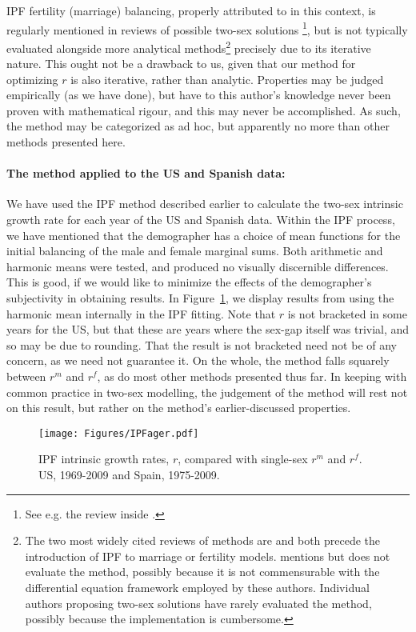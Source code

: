 IPF fertility (marriage) balancing, properly attributed to \citet{mc1975models}
in this context, is regularly mentioned in reviews of possible two-sex solutions \footnote{See e.g.
the review inside \citet{ianelli2005gender}.}, but is not typically
evaluated alongside more analytical
methods\footnote{The two most widely cited
reviews of methods are \citet{keyfitz1972mathematics} and
\citet{pollard1973mathematical} both precede the introduction of IPF to
marriage or fertility models. \citet{ianelli2005gender} mentions but does not
evaluate the method, possibly because it is not commensurable with the
differential equation framework employed by these authors. Individual authors proposing
two-sex solutions have rarely evaluated the method, possibly because the implementation
is cumbersome.} precisely due to its iterative nature. This ought not be a
drawback to us, given that our method for optimizing $r$ is also iterative,
rather than analytic. Properties may be judged empirically (as we have done),
but have to this author's knowledge never been proven with mathematical rigour,
and this may never be accomplished. As such, the method may be categorized as ad
hoc, but apparently no more than other methods presented here.

\paragraph{The method applied to the US and Spanish data:}

We have used the IPF method described earlier to calculate the two-sex intrinsic
growth rate for each year of the US and Spanish data. Within the IPF process, we
have mentioned that the demographer has a choice of mean functions for the
initial balancing of the male and female marginal sums. Both arithmetic and
harmonic means were tested, and produced no visually discernible differences.
This is good, if we would like to minimize the effects of the demographer's
subjectivity in obtaining results. In Figure~\ref{fig:IPFager}, we display
results from using the harmonic mean internally in the IPF fitting. Note that
$r$ is not bracketed in some years for the US, but that these are years where 
the sex-gap itself was trivial, and so may be due to
rounding. That the result is not bracketed need not be of any concern, as we
need not guarantee it. On the whole, the method falls squarely between $r^m$ and
$r^f$, as do most other methods presented thus far. In keeping with common
practice in two-sex modelling, the judgement of the method will rest not on this
result, but rather on the method's earlier-discussed properties.

\begin{figure}[ht!]
        \centering  
          \caption{IPF intrinsic growth rates, $r$, compared with
          single-sex $r^m$ and $r^f$. US, 1969-2009 and Spain, 1975-2009.}
           \texttt{[image: Figures/IPFager.pdf]}
          \label{fig:IPFager}
\end{figure}




\FloatBarrier

